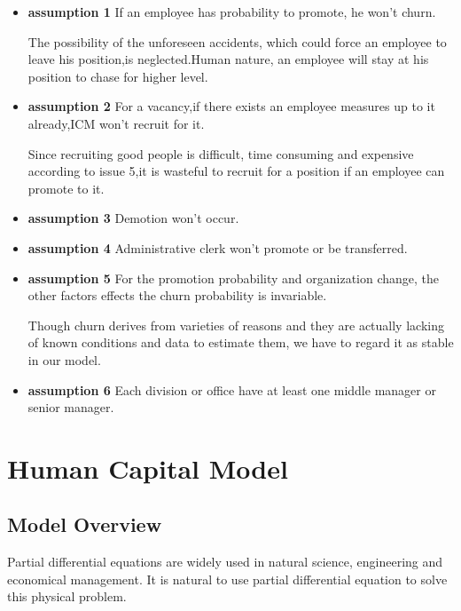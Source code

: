 \documentclass[12pt,a4paper,titlepage]{article}
\begin{document}
\begin{itemize}
\item \textbf{assumption 1} If an employee has probability to
  promote, he won't churn.

The possibility of the unforeseen accidents, which could force an
employee to leave his position,is neglected.Human nature, an employee
will stay at his position to chase for higher level.

\item \textbf{assumption 2} For a vacancy,if there exists an
  employee measures up to it already,ICM won't recruit for it.

Since recruiting good people is difficult, time consuming and
expensive according to issue 5,it is wasteful to recruit for a
position if an employee can promote to it.

\item \textbf{assumption 3} Demotion won't occur.

\item \textbf{assumption 4} Administrative clerk won't promote or be
  transferred.

\item \textbf{assumption 5} For the promotion probability and
  organization change, the other factors effects the churn probability
  is invariable.

Though churn derives from varieties of reasons and they are actually
lacking of known conditions and data to estimate them, we have to
regard it as stable in our model.

\item \textbf{assumption 6} Each division or office have at least one
  middle manager or senior manager.

\end{itemize}

\section{Human Capital Model}
\label{sec:human-capital-model}

\subsection{Model Overview}
\label{sec:model-overview}

Partial differential equations are widely used in natural science, engineering and economical management.
It is natural to use partial differential equation to solve this physical problem.
\end{document}
